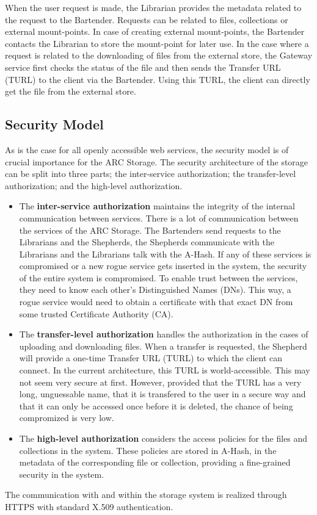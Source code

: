 \documentclass[final]{ieee}
\begin{document}
When the user request is made, the Librarian provides the metadata related
to the request to the Bartender. Requests can be related to
files, collections or external mount-points. In case of creating
external mount-points, the Bartender contacts the Librarian to store
the mount-point for later use. In the case where a request is related
to the downloading of files from the external store, the Gateway service first checks the status of the file
and then sends the Transfer URL (TURL) to the client via the
Bartender. Using this TURL, the client can directly get the file from
the external store. %

\subsection{Security Model }
\label{Security Model }

As is the case for all openly accessible web services, the security
model is of crucial importance for the ARC Storage. The security
architecture of the storage can be split into three parts; the
inter-service authorization; the transfer-level authorization; and the
high-level authorization.
\begin{itemize}
\item The \textbf{inter-service authorization} maintains the integrity of the
  internal communication between services. There is a lot of
  communication between the services of the ARC Storage. The
  Bartenders send requests to the Librarians and the Shepherds, the
  Shepherds communicate with the Librarians and the Librarians talk with
  the A-Hash. If any of these services is compromised or a new
  rogue service gets inserted in the system, the security of the
  entire system is compromised. To enable trust between the services,
  they need to know each other's Distinguished Names (DNs). This way,
  a rogue service would need to obtain a certificate with that exact
  DN from some trusted Certificate Authority (CA).
\item The \textbf{transfer-level authorization} handles the
  authorization in the cases of uploading and downloading files. When
  a transfer is requested, the Shepherd will provide a one-time
  Transfer URL (TURL) to which the client can connect. In the
  current architecture, this TURL is world-accessible. This may not seem
  very secure at first. However, provided that the TURL has a very long,
  unguessable name, that it is transfered to the user in a secure way
  and that it can only be accessed once before it is deleted, the
  chance of being compromized is very low.
\item The \textbf{high-level authorization} considers the access
  policies for the files and collections in the system. These policies
  are stored in A-Hash, in the metadata of the corresponding file or
  collection, providing a fine-grained security in the system.
\end{itemize}
The communication with and within the storage system is realized
through HTTPS with standard X.509 authentication.
\end{document}
